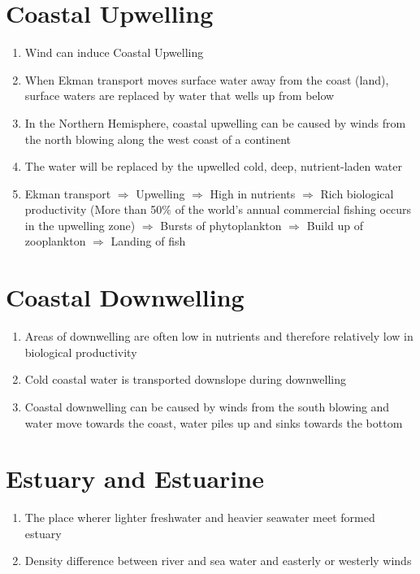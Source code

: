 \documentclass{report}
\begin{document}
\section{Coastal Upwelling}
\begin{enumerate}
    \item Wind can induce Coastal Upwelling
    \item When Ekman transport moves surface water away from the coast (land), surface waters are replaced by water that wells up from below 
    \item In the Northern Hemisphere, coastal upwelling can be caused by winds from the north blowing along the west coast of a continent 
    \item The water will be replaced by the upwelled cold, deep, nutrient-laden water
    \item Ekman transport $\Rightarrow $ Upwelling $\Rightarrow $ High in nutrients $\Rightarrow $ Rich biological productivity (More than 50$\%$ of the world's annual commercial fishing occurs in the upwelling zone) $\Rightarrow $ Bursts of phytoplankton $\Rightarrow $ Build up of zooplankton $\Rightarrow $ Landing of fish
\end{enumerate}


\section{Coastal Downwelling}
\begin{enumerate}
    \item Areas of downwelling are often low in nutrients and therefore relatively low in biological productivity 
    \item Cold coastal water is transported downslope during downwelling
    \item Coastal downwelling can be caused by winds from the south blowing and water move towards the coast, water piles up and sinks towards the bottom 
\end{enumerate}


\section{Estuary and Estuarine}
\begin{enumerate}
    \item The place wherer lighter freshwater and heavier seawater meet formed estuary 
    \item Density difference between river and sea water and easterly or westerly winds 
\end{enumerate}
\end{document}

